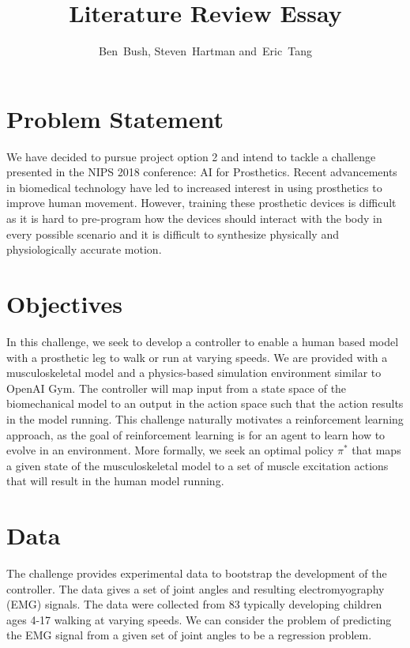 \documentclass[journal,onecolumn]{IEEEtran}
\begin{document}
\title{Literature Review Essay}


\author{Ben~Bush,
        Steven~Hartman
        and~Eric~Tang%
        }
\section{Problem Statement}
We have decided to pursue project option 2 and intend to tackle a challenge presented in the NIPS 2018 conference: AI for Prosthetics. Recent advancements in biomedical technology have led to increased interest in using prosthetics to improve human movement. However, training these prosthetic devices is difficult as it is hard to pre-program how the devices should interact with the body in every possible scenario and it is difficult to synthesize
physically and physiologically accurate motion.
\section{Objectives}
In this challenge, we seek to develop a controller to enable a human based model with a prosthetic leg to walk or run at varying speeds. We are provided with a musculoskeletal model and a physics-based simulation environment similar to OpenAI Gym. The controller will map
input from a state space of the biomechanical model to an output in the action space such that the action results in the model running. This challenge naturally motivates a reinforcement learning approach, as the goal of reinforcement learning is for an agent to learn how to evolve in an environment. More formally, we seek an optimal policy $\pi^{*}$ that maps a given state of the musculoskeletal model to a set of muscle excitation actions that will result in the human model
running. 
\section{Data}
The challenge provides experimental data to bootstrap the development of the controller. The data gives a set of joint angles and resulting electromyography (EMG) signals. The data were collected from 83 typically developing children ages 4-17 walking at varying speeds. We can consider the problem of predicting the EMG signal from a given set of joint angles to be a regression problem. 
\end{document}
